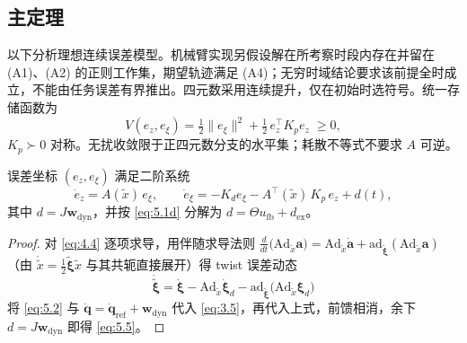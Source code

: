 \subsection{主定理}

以下分析理想连续误差模型。机械臂实现另假设解在所考察时段内存在并留在 (A1)、(A2) 的正则工作集，期望轨迹满足 (A4)；无穷时域结论要求该前提全时成立，不能由任务误差有界推出。四元数采用连续提升，仅在初始时选符号。统一存储函数为
\begin{equation}
V(e_z,e_\xi)=\tfrac12\|e_\xi\|^2+\tfrac12\,e_z^{\top}K_pe_z\;\ge0 ,
\tag{5.4a}\label{eq:5.4a}
\end{equation}
$K_p\succ0$ 对称。无扰收敛限于正四元数分支的水平集；耗散不等式不要求 $A$ 可逆。

\setcounter{theorem}{2}%
\renewcommand{\thetheorem}{3(a)}%
\begin{theorem}[闭环误差动态]\label{thm:3a}
误差坐标 $(e_z,e_\xi)$ 满足二阶系统
\begin{equation}
\dot e_z=A(\tilde x)\,e_\xi,\qquad
\dot e_\xi=-K_d e_\xi-A^{\top}(\tilde x)\,K_p\,e_z+d(t),
\tag{5.5}\label{eq:5.5}
\end{equation}
其中 $d=J\boldsymbol w_{\mathrm{dyn}}$，并按 \eqref{eq:5.1d} 分解为 $d=\Theta u_{\mathrm{fb}}+d_{\mathrm{ex}}$。
\end{theorem}

\begin{proof}
对 \eqref{eq:4.4} 逐项求导，用伴随求导法则 $\frac{d}{dt}\bigl(\mathrm{Ad}_{\tilde x}\boldsymbol a\bigr)=\mathrm{Ad}_{\tilde x}\dot{\boldsymbol a}+\mathrm{ad}_{\tilde{\boldsymbol\xi}}(\mathrm{Ad}_{\tilde x}\boldsymbol a)$（由 $\dot{\tilde x}=\tfrac12\tilde{\boldsymbol\xi}\tilde x$ 与其共轭直接展开）得 twist 误差动态
\begin{equation}
\dot{\tilde{\boldsymbol\xi}}=\dot{\boldsymbol\xi}-\mathrm{Ad}_{\tilde x}\dot{\boldsymbol\xi}_d-\mathrm{ad}_{\tilde{\boldsymbol\xi}}\bigl(\mathrm{Ad}_{\tilde x}\boldsymbol\xi_d\bigr)
\tag{5.5a}\label{eq:5.5a}
\end{equation}
将 \eqref{eq:5.2} 与 $\ddot{\boldsymbol q}=\ddot{\boldsymbol q}_{\mathrm{ref}}+\boldsymbol w_{\mathrm{dyn}}$ 代入 \eqref{eq:3.5}，再代入上式，前馈相消，余下 $d=J\boldsymbol w_{\mathrm{dyn}}$ 即得 \eqref{eq:5.5}。
\end{proof}

